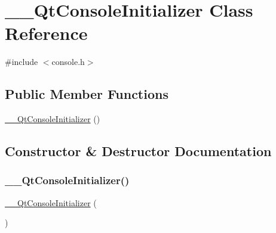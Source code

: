 \hypertarget{classstanfordcpplib_1_1qtgui_1_1____QtConsoleInitializer}{}\section{\+\_\+\+\_\+\+Qt\+Console\+Initializer Class Reference}
\label{classstanfordcpplib_1_1qtgui_1_1____QtConsoleInitializer}


{\ttfamily \#include $<$console.\+h$>$}

\subsection*{Public Member Functions}
\begin{DoxyCompactItemize}
\item 
\mbox{\hyperlink{classstanfordcpplib_1_1qtgui_1_1____QtConsoleInitializer_ad00e2b9fea08ce5e9307a31341478255}{\+\_\+\+\_\+\+Qt\+Console\+Initializer}} ()
\end{DoxyCompactItemize}


\subsection{Constructor \& Destructor Documentation}
\mbox{\label{classstanfordcpplib_1_1qtgui_1_1____QtConsoleInitializer_ad00e2b9fea08ce5e9307a31341478255}} 
\subsubsection{\texorpdfstring{\+\_\+\+\_\+\+Qt\+Console\+Initializer()}{\_\_QtConsoleInitializer()}}
{\footnotesize\ttfamily \mbox{\hyperlink{classstanfordcpplib_1_1qtgui_1_1____QtConsoleInitializer}{\+\_\+\+\_\+\+Qt\+Console\+Initializer}} (\begin{DoxyParamCaption}{ }\end{DoxyParamCaption})\hspace{0.3cm}{\ttfamily [inline]}}

